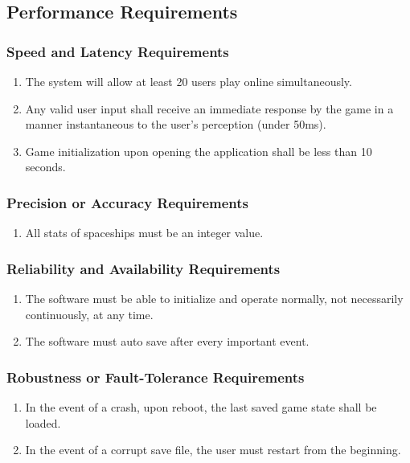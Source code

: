 \documentclass[]{article}
\begin{document}

\subsection{Performance Requirements}
\label{sub:performance_requirements}

\subsubsection{Speed and Latency Requirements}
\label{ssub:speed_and_latency_requirements}
\begin{enumerate}[{PR}1. ]
	\item The system will allow at least 20 users play online simultaneously.
	\item Any valid user input shall receive an immediate response by the game in a manner instantaneous to the user’s perception (under 50ms).
	\item Game initialization upon opening the application shall be less than 10 seconds.
\end{enumerate}

\subsubsection{Precision or Accuracy Requirements}
\label{ssub:precision_or_accuracy_requirements}
\begin{enumerate}[{PR}1. ]
	\item All stats of spaceships must be an integer value.
\end{enumerate}

\subsubsection{Reliability and Availability Requirements}
\label{ssub:reliability_and_availability_requirements}
\begin{enumerate}[{PR}1. ]
	\item The software must be able to initialize and operate normally, not necessarily continuously, at any time.
	\item The software must auto save after every important event.
\end{enumerate}

\subsubsection{Robustness or Fault-Tolerance Requirements}
\label{ssub:robustness_or_fault_tolerance_requirements}
\begin{enumerate}[{PR}1. ]
	\item In the event of a crash, upon reboot, the last saved game state shall be loaded.
	\item In the event of a corrupt save file, the user must restart from the beginning.
\end{enumerate}
\end{document}
